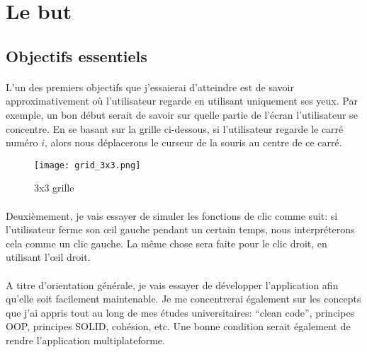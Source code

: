 \section{Le but}
\subsection{Objectifs essentiels}
\paragraph{}
\label{chapter-introduction-first-objective}
L'un des premiers objectifs que j'essaierai d'atteindre est de savoir approximativement où l'utilisateur regarde en utilisant uniquement ses yeux.
Par exemple, un bon début serait de savoir sur quelle partie de l'écran l'utilisateur se concentre.
En se basant sur la grille ci-dessous, si l'utilisateur regarde le carré numéro $i$, alors nous déplacerons le curseur de la souris au centre de ce carré.
\begin{figure}[H]
    \centering
    \texttt{[image: grid\_3x3.png]}
    \caption{3x3 grille}
\end{figure}

\paragraph{}
Deuxièmement, je vais essayer de simuler les fonctions de clic comme suit: si l'utilisateur ferme son œil gauche pendant un certain temps, nous interpréterons cela comme un clic gauche.
La même chose sera faite pour le clic droit, en utilisant l'œil droit.

\paragraph{}
A titre d'orientation générale, je vais essayer de développer l'application afin qu'elle soit facilement maintenable.
Je me concentrerai également sur les concepts que j'ai appris tout au long de mes études universitaires: ``clean code'', principes OOP, principes SOLID, cohésion, etc.
Une bonne condition serait également de rendre l'application multiplateforme.


